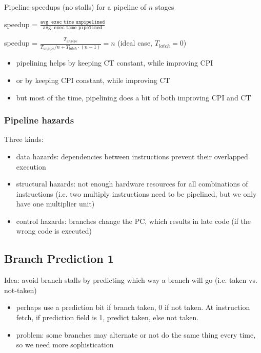\documentclass[12pt]{extarticle}
\begin{document}
	\noindent Pipeline speedups (no stalls) for a pipeline of $n$ stages

	speedup = $\frac{\texttt{avg. exec time unpipelined}}{\texttt{avg. exec time pipelined}}$

	speedup = $\frac{T_{unpipe}}{T_{unpipe} / n + T_{latch} \cdot (n - 1)} = n$ (ideal case, $T_{latch} = 0$)

	\begin{itemize}
		\item pipelining helps by keeping CT constant, while improving CPI
		\item or by keeping CPI constant, while improving CT
		\item but most of the time, pipelining does a bit of both improving CPI and CT
	\end{itemize}

	\subsubsection{Pipeline hazards}

	Three kinds:

	\begin{itemize}
		\item data hazards: dependencies between instructions prevent their overlapped execution
		\item structural hazards: not enough hardware resources for all combinations of instructions (i.e. two multiply 
		instructions need to be pipelined, but we only have one multiplier unit)
		\item control hazards: branches change the PC, which results in late code (if the wrong code is executed)
	\end{itemize}

	\subsection{Branch Prediction 1}

	Idea: avoid branch stalls by predicting which way a branch will go (i.e. taken vs. not-taken)

	\begin{itemize}
		\item perhaps use a prediction bit if branch taken, 0 if not taken. At instruction fetch, if prediction field is 1, 
		predict taken, else not taken.
		\item problem: some branches may alternate or not do the same thing every time, so we need more sophistication
	\end{itemize}
\end{document}
